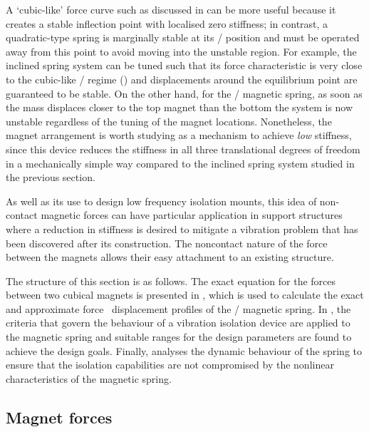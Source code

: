 \documentclass[11pt,a4paper]{memoir}
\begin{document}
A `cubic-like' force curve such as discussed in  can be more
useful because it creates a stable inflection point with localised zero
stiffness;
in contrast, a
quadratic-type spring is marginally stable at its \qzs/ position and must be
operated away from this point to avoid moving into the unstable region.
For example, the inclined spring system can be tuned such that its force characteristic is very close to the cubic-like \qzs/ regime () and displacements around the equilibrium point are guaranteed to be stable.
On the other hand, for the \qzs/ magnetic spring, as soon as the mass displaces closer to the top magnet than the bottom the system is now unstable regardless of the tuning of the magnet locations.
Nonetheless, the magnet arrangement is worth studying as a mechanism to
achieve \emph{low} stiffness, since this device reduces the stiffness in all
three translational degrees of freedom in a mechanically simple way compared
to the inclined spring system studied in the previous section.

As well as its use to design low frequency isolation mounts, this idea of
non-contact magnetic forces can have particular application in support
structures where a reduction in stiffness is desired to mitigate a vibration
problem that has been discovered after its construction. The noncontact nature
of the force between the magnets allows their easy attachment to an existing
structure.

The structure of this section is as follows. The exact equation for the
forces between two cubical magnets is presented in , which is
used to calculate the exact and approximate force \vs\  displacement
profiles of the \qzs/ magnetic spring. In , the
criteria that govern the behaviour of a vibration isolation device
are applied to the magnetic spring and suitable ranges for the
design parameters are found to achieve the design goals.
Finally,  analyses the dynamic behaviour of the spring
to ensure that the isolation capabilities are not compromised by the
nonlinear characteristics of the magnetic spring.


\subsection{Magnet forces}
\end{document}
